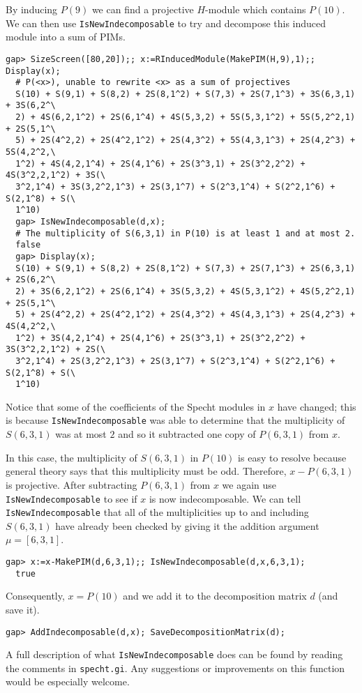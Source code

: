 \documentclass[a4paper,11pt]{report}
\begin{document}
{{{ By inducing $P(9)$ we can find a projective $H$-module which contains $P(10)$. We can then use \texttt{IsNewIndecomposable} to try and decompose this induced module into a sum of PIMs. 
\begin{Verbatim}[fontsize=\small,frame=single,label=Example]
  gap> SizeScreen([80,20]);; x:=RInducedModule(MakePIM(H,9),1);; Display(x);
  # P(<x>), unable to rewrite <x> as a sum of projectives
  S(10) + S(9,1) + S(8,2) + 2S(8,1^2) + S(7,3) + 2S(7,1^3) + 3S(6,3,1) + 3S(6,2^\
  2) + 4S(6,2,1^2) + 2S(6,1^4) + 4S(5,3,2) + 5S(5,3,1^2) + 5S(5,2^2,1) + 2S(5,1^\
  5) + 2S(4^2,2) + 2S(4^2,1^2) + 2S(4,3^2) + 5S(4,3,1^3) + 2S(4,2^3) + 5S(4,2^2,\
  1^2) + 4S(4,2,1^4) + 2S(4,1^6) + 2S(3^3,1) + 2S(3^2,2^2) + 4S(3^2,2,1^2) + 3S(\
  3^2,1^4) + 3S(3,2^2,1^3) + 2S(3,1^7) + S(2^3,1^4) + S(2^2,1^6) + S(2,1^8) + S(\
  1^10)
  gap> IsNewIndecomposable(d,x);
  # The multiplicity of S(6,3,1) in P(10) is at least 1 and at most 2.
  false
  gap> Display(x);
  S(10) + S(9,1) + S(8,2) + 2S(8,1^2) + S(7,3) + 2S(7,1^3) + 2S(6,3,1) + 2S(6,2^\
  2) + 3S(6,2,1^2) + 2S(6,1^4) + 3S(5,3,2) + 4S(5,3,1^2) + 4S(5,2^2,1) + 2S(5,1^\
  5) + 2S(4^2,2) + 2S(4^2,1^2) + 2S(4,3^2) + 4S(4,3,1^3) + 2S(4,2^3) + 4S(4,2^2,\
  1^2) + 3S(4,2,1^4) + 2S(4,1^6) + 2S(3^3,1) + 2S(3^2,2^2) + 3S(3^2,2,1^2) + 2S(\
  3^2,1^4) + 2S(3,2^2,1^3) + 2S(3,1^7) + S(2^3,1^4) + S(2^2,1^6) + S(2,1^8) + S(\
  1^10)
\end{Verbatim}
 Notice that some of the coefficients of the Specht modules in $x$ have changed; this is because \texttt{IsNewIndecomposable} was able to determine that the multiplicity of $S(6,3,1)$ was at most $2$ and so it subtracted one copy of $P(6,3,1)$ from $x$.

 In this case, the multiplicity of $S(6,3,1)$ in $P(10)$ is easy to resolve because general theory says that this multiplicity must be
odd. Therefore, $x-P(6,3,1)$ is projective. After subtracting $P(6,3,1)$ from $x$ we again use \texttt{IsNewIndecomposable} to see if $x$ is now indecomposable. We can tell \texttt{IsNewIndecomposable} that all of the multiplicities up to and including $S(6,3,1)$ have already been checked by giving it the addition argument $\mu=[6,3,1]$. 
\begin{Verbatim}[fontsize=\small,frame=single,label=Example]
  gap> x:=x-MakePIM(d,6,3,1);; IsNewIndecomposable(d,x,6,3,1);
  true
\end{Verbatim}
 Consequently, $x=P(10)$ and we add it to the decomposition matrix $d$ (and save it). 
\begin{Verbatim}[fontsize=\small,frame=single,label=Example]
  gap> AddIndecomposable(d,x); SaveDecompositionMatrix(d);
\end{Verbatim}
 A full description of what \texttt{IsNewIndecomposable} does can be found by reading the comments in \texttt{specht.gi}. Any suggestions or improvements on this function would be especially
welcome.

}}}
\end{document}
